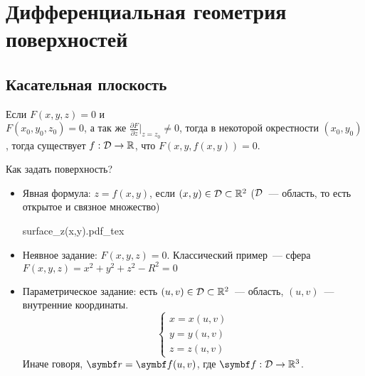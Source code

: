 \documentclass[main]{subfiles}
\begin{document}
\part{Дифференциальная геометрия поверхностей}
\chapter{Касательная плоскость}
\begin{theorem*}
    Если $F(x,y,z) = 0$ и \\
    $F(x_0, y_0,z_0) = 0$,
    а так же $\frac{\partial F}{\partial z}\rvert_{z = z_0} \neq 0$,
    тогда в некоторой окрестности $(x_0, y_0)$,
    тогда существует $f: \mathcal{D} \to \mathbb{R}$, что $F(x, y, f(x,y)) =0$.
\end{theorem*}

Как задать поверхность?
\begin{itemize}
    \item Явная формула: $z = f(x,y)$, если $(x,y) \in \mathcal{D} \subset \mathbb{R}^2$
          ($\mathcal{D}$~--- область, то есть открытое и связное множество)
          \begin{center}
              {surface_z(x,y).pdf_tex}
          \end{center}
    \item Неявное задание: $F(x,y,z) = 0$. Классический пример~--- сфера
          $F(x,y,z)=x^2 + y^2 + z^2 - R^2 = 0$
    \item Параметрическое задание:
          есть $(u,v) \in \mathcal{D} \subset \mathbb{R}^2$~--- область,
          $(u,v)$~--- внутренние координаты.
          \[\begin{cases}
                  x = x(u,v) \\
                  y = y(u,v) \\
                  z = z(u,v)
              \end{cases}\]
          Иначе говоря, $\vr = \vf(u,v)$, где $\vf: \fancyD \to \R^3$.
\end{itemize}
\end{document}
